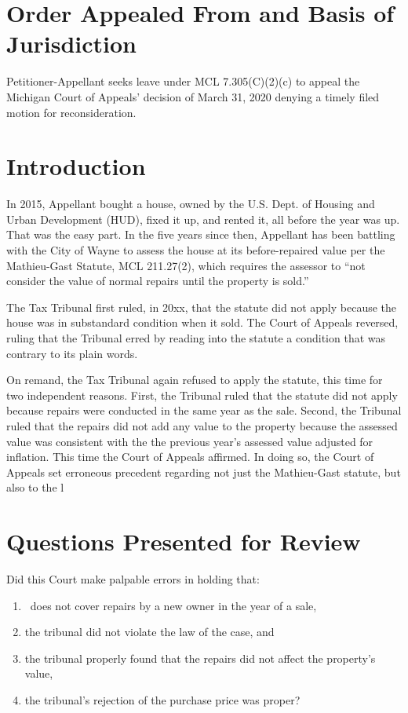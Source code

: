 \documentclass[12pt,\documentclassflag]{michiganCourtOfAppealsBrief}
\begin{document}
\section{Order Appealed From and Basis of Jurisdiction}

Petitioner-Appellant seeks leave under MCL 7.305(C)(2)(c) to appeal the Michigan Court of Appeals' decision of March 31, 2020 denying a timely filed motion for reconsideration. 

\section{Introduction}

In 2015, Appellant bought a house, owned by the U.S. Dept. of Housing and Urban Development (HUD), fixed it up, and rented it, all before the year was up. That was the easy part. In the five years since then, Appellant has been battling with the City of Wayne to assess the house at its before-repaired value per the Mathieu-Gast Statute, MCL 211.27(2), which requires the assessor to ``not consider the value of normal repairs until the property is sold.''

The Tax Tribunal first ruled, in 20xx, that the statute did not apply because the house was in substandard condition when it sold. The Court of Appeals reversed, ruling that the Tribunal erred by reading into the statute a condition that was contrary to its plain words.

On remand, the Tax Tribunal again refused to apply the statute, this time for two independent reasons. First, the Tribunal ruled that the statute did not apply because repairs were conducted in the same year as the sale. Second, the Tribunal ruled that the repairs did not add any value to the property because the assessed value was consistent with the the previous year's assessed value adjusted for inflation. This time the Court of Appeals affirmed. In doing so, the Court of Appeals set erroneous precedent regarding not just the Mathieu-Gast statute, but also to the l


\section{Questions Presented for Review}

Did this Court make palpable errors in holding that:
\begin{enumerate}
\item \mathieuGast\ does not cover repairs by a new owner in the year of a sale,
\item the tribunal did not violate the law of the case, and 
\item the tribunal properly found that the repairs did not affect the property's value,
\item the tribunal's rejection of the purchase price was proper?
\end{enumerate}
\end{document}
